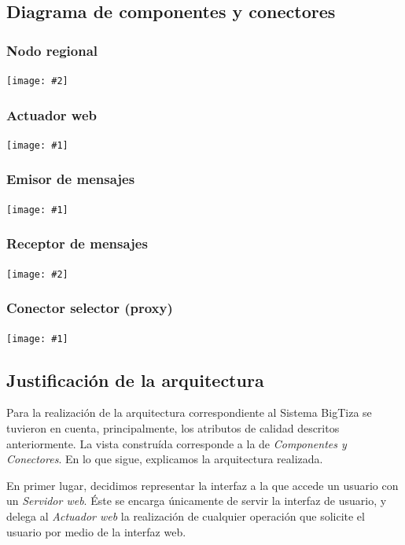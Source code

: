 \documentclass[a4paper, 10pt, twoside]{article}
\newcommand{\diagrama}[1]{
  \begin{center}
    \texttt{[image: \#1]}
  \end{center}
}
\newcommand{\diagramadeancho}[2]{
  \begin{center}
    \texttt{[image: \#2]}
  \end{center}
}
\begin{document}
\newpage

\subsection{Diagrama de componentes y conectores}


\subsubsection{Nodo regional}

\diagramadeancho{14cm}{./diagramas/nodoregional.pdf}
\newpage


\subsubsection{Actuador web}

\diagrama{./diagramas/actuadorweb.pdf}
\newpage


\subsubsection{Emisor de mensajes}

\diagrama{./diagramas/emisordemensajes.pdf}
\newpage


\subsubsection{Receptor de mensajes}

\diagramadeancho{12cm}{./diagramas/receptordemensajes.pdf}
\newpage


\subsubsection{Conector selector (proxy)}

\diagrama{./diagramas/conectorselector.pdf}
\newpage


\subsection{Justificación de la arquitectura}

Para la realización de la arquitectura correspondiente al Sistema BigTiza se tuvieron en cuenta, principalmente, los atributos de calidad descritos anteriormente. La vista construída corresponde a la de \textit{Componentes y Conectores}. En lo que sigue, explicamos la arquitectura realizada.

En primer lugar, decidimos representar la interfaz a la que accede un usuario con un \textit{Servidor web}. Éste se encarga únicamente de servir la interfaz de usuario, y delega al \textit{Actuador web} la realización de cualquier operación que solicite el usuario por medio de la interfaz web.
\end{document}
